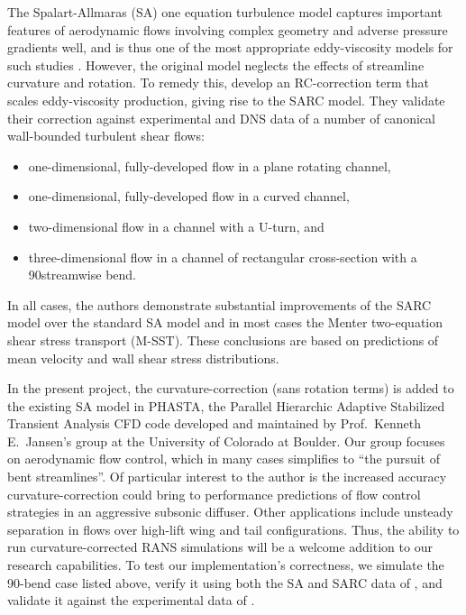 \documentclass[11pt]{article}
\begin{document}
The Spalart-Allmaras (SA) one equation turbulence model captures important features of aerodynamic flows involving complex geometry and adverse pressure gradients well, and is thus one of the most appropriate eddy-viscosity models for such studies \citep{spalart1992}. However, the original model neglects the effects of streamline curvature and rotation. To remedy this, \citet{shur2000} develop an RC-correction term that scales eddy-viscosity production, giving rise to the SARC model. They validate their correction against experimental and DNS data of a number of canonical wall-bounded turbulent shear flows: 
\begin{itemize}
\item one-dimensional, fully-developed flow in a plane rotating channel,
\item one-dimensional, fully-developed flow in a curved channel,
\item two-dimensional flow in a channel with a U-turn, and
\item three-dimensional flow in a channel of rectangular cross-section with a 90\degree streamwise bend.
\end{itemize}
In all cases, the authors demonstrate substantial improvements of the SARC model over the standard SA model and in most cases the Menter two-equation shear stress transport (M-SST). These conclusions are based on predictions of mean velocity and wall shear stress distributions.

In the present project, the \citet{shur2000} curvature-correction (sans rotation terms) is added to the existing SA model in PHASTA, the Parallel Hierarchic Adaptive Stabilized Transient Analysis CFD code developed and maintained by Prof.\ Kenneth E.\ Jansen's group at the University of Colorado at Boulder. Our group focuses on aerodynamic flow control, which in many cases simplifies to ``the pursuit of bent streamlines''. Of particular interest to the author is the increased accuracy curvature-correction could bring to performance predictions of flow control strategies in an aggressive subsonic diffuser. Other applications include unsteady separation in flows over high-lift wing and tail configurations. Thus, the ability to run curvature-corrected RANS simulations will be a welcome addition to our research capabilities. To test our implementation's correctness, we simulate the 90\degree-bend case listed above, verify it using both the SA and SARC data of \citet{shur2000}, and validate it against the experimental data of \citet{kim1994}.
\end{document}
